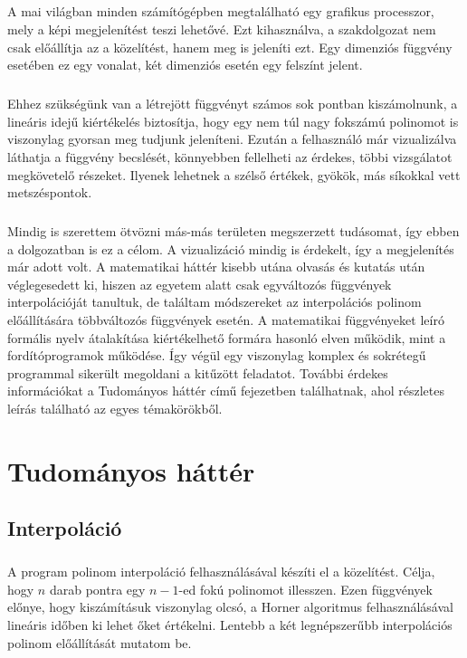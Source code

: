 \documentclass{elteikthesis}
\begin{document}
\paragraph{}
A mai világban minden számítógépben megtalálható egy grafikus processzor, mely a képi megjelenítést teszi lehetővé. Ezt kihasználva, a szakdolgozat nem csak előállítja az a közelítést, hanem meg is jeleníti ezt. Egy dimenziós függvény esetében ez egy vonalat, két dimenziós esetén egy felszínt jelent.
\paragraph{}
Ehhez szükségünk van a létrejött függvényt számos sok pontban kiszámolnunk, a lineáris idejű kiértékelés biztosítja, hogy egy nem túl nagy fokszámú polinomot is viszonylag gyorsan meg tudjunk jeleníteni. Ezután a felhasználó már vizualizálva láthatja a függvény becslését, könnyebben fellelheti az érdekes, többi vizsgálatot megkövetelő részeket. Ilyenek lehetnek a szélső értékek, gyökök, más síkokkal vett metszéspontok.
\paragraph{}
Mindig is szerettem ötvözni más-más területen megszerzett tudásomat, így ebben a dolgozatban is ez a célom. A vizualizáció mindig is érdekelt, így a megjelenítés már adott volt. A matematikai háttér kisebb utána olvasás és kutatás után véglegesedett ki, hiszen az egyetem alatt csak egyváltozós függvények interpolációját tanultuk, de találtam módszereket az interpolációs polinom előállítására többváltozós függvények esetén. A matematikai függvényeket leíró formális nyelv átalakítása kiértékelhető formára hasonló elven működik, mint a fordítóprogramok működése. Így végül egy viszonylag komplex és sokrétegű programmal sikerült megoldani a kitűzött feladatot. További érdekes információkat a Tudományos háttér című fejezetben találhatnak, ahol részletes leírás található az egyes témakörökből.

\chapter{Tudományos háttér}
\section{Interpoláció}
\paragraph{}
A program polinom interpoláció felhasználásával készíti el a közelítést. Célja, hogy $n$ darab pontra egy $n-1$-ed fokú polinomot illesszen. Ezen függvények előnye, hogy kiszámításuk viszonylag olcsó, a Horner algoritmus felhasználásával lineáris időben ki lehet őket értékelni. Lentebb a két legnépszerűbb interpolációs polinom előállítását mutatom be. 
\end{document}

